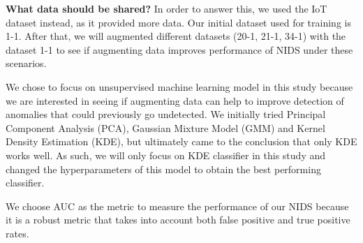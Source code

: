 \begin{method}
\textbf{What data should be shared?} 
In order to answer this, we used the IoT dataset instead, as it provided more data. Our initial dataset used for training is 1-1. After that, we will augmented different datasets (20-1, 21-1, 34-1) with the dataset 1-1 to see if augmenting data improves performance of NIDS under these scenarios.

We chose to focus on unsupervised machine learning model in this study because we are interested in seeing if augmenting data can help to improve detection of anomalies that could previously go undetected. We initially tried Principal Component Analysis (PCA), Gaussian Mixture Model (GMM) and Kernel Density Estimation (KDE), but ultimately came to the conclusion that only KDE works well. As such, we will only focus on KDE classifier in this study and changed the hyperparameters of this model to obtain the best performing classifier. 

We choose AUC as the metric to measure the performance of our NIDS because it is a robust metric that takes into account both false positive and true positive rates.

\end{method}
